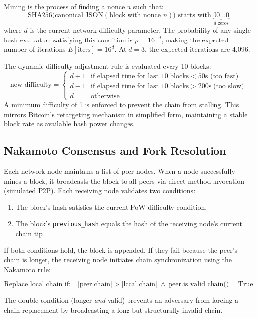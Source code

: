 \documentclass[12pt,a4paper]{report}
\begin{document}
Mining is the process of finding a nonce $n$ such that:
\[
  \text{SHA256}\bigl(\text{canonical\_JSON}(\text{block with nonce } n)\bigr)
  \text{ starts with } \underbrace{00\ldots0}_{d \text{ zeros}}
\]
where $d$ is the current network difficulty parameter. The probability of any single
hash evaluation satisfying this condition is $p = 16^{-d}$, making the expected number
of iterations $E[\text{iters}] = 16^d$. At $d = 3$, the expected iterations are 4,096.

The dynamic difficulty adjustment rule is evaluated every 10 blocks:
\[
  \text{new difficulty} = \begin{cases}
    d + 1 & \text{if elapsed time for last 10 blocks} < 50\text{s (too fast)} \\
    d - 1 & \text{if elapsed time for last 10 blocks} > 200\text{s (too slow)} \\
    d     & \text{otherwise}
  \end{cases}
\]
A minimum difficulty of 1 is enforced to prevent the chain from stalling. This mirrors
Bitcoin's retargeting mechanism in simplified form, maintaining a stable block rate as
available hash power changes.

\subsection{Nakamoto Consensus and Fork Resolution}

Each network node maintains a list of peer nodes. When a node successfully mines a block,
it broadcasts the block to all peers via direct method invocation (simulated P2P). Each
receiving node validates two conditions:
\begin{enumerate}[label=\arabic*.]
  \item The block's hash satisfies the current PoW difficulty condition.
  \item The block's \texttt{previous\_hash} equals the hash of the receiving node's
        current chain tip.
\end{enumerate}

If both conditions hold, the block is appended. If they fail because the peer's chain is
longer, the receiving node initiates chain synchronization using the Nakamoto rule:

\[
  \text{Replace local chain if:} \quad
  |\text{peer.chain}| > |\text{local.chain}| \;\wedge\; \text{peer.is\_valid\_chain()} = \text{True}
\]

The double condition (longer \textit{and} valid) prevents an adversary from forcing a
chain replacement by broadcasting a long but structurally invalid chain.
\end{document}
